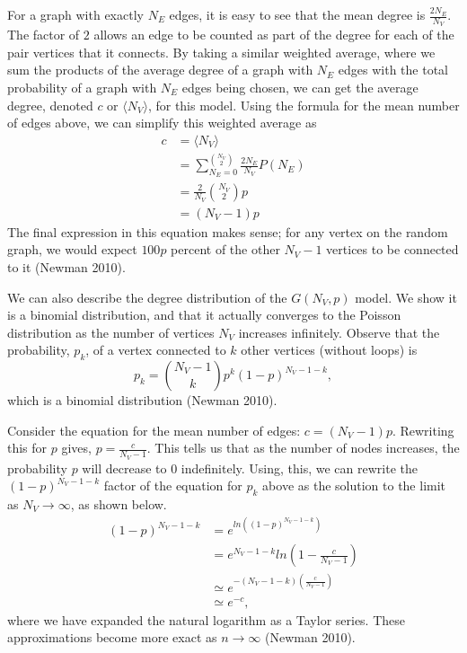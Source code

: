 \documentclass[12pt,twoside]{amherstthesis}
\begin{document}
  For a graph with exactly \(N_{E}\) edges, it is easy to see that the
  mean degree is \(\frac {2N_{E}} {N_{V}}\). The factor of \(2\) allows an
  edge to be counted as part of the degree for each of the pair vertices
  that it connects. By taking a similar weighted average, where we sum the
  products of the average degree of a graph with \(N_E\) edges with the
  total probability of a graph with \(N_E\) edges being chosen, we can get
  the average degree, denoted \(c\) or \(\langle N_{V} \rangle\), for this
  model. Using the formula for the mean number of edges above, we can
  simplify this weighted average as \[
  \begin{aligned}
  c &= \langle N_{V} \rangle \\
  &= \sum_{N_{E}=0}^{{N_{V} \choose 2}} \frac {2N_{E}} {N_{V}} P(N_{E}) \\
  &= \frac {2} {N_{V}} {N_{V} \choose 2}p \\
  &= (N_{V} - 1)p
  \end{aligned}
  \] The final expression in this equation makes sense; for any vertex on
  the random graph, we would expect \(100p\) percent of the other
  \(N_{V} - 1\) vertices to be connected to it (Newman 2010).
  
  We can also describe the degree distribution of the \(G(N_V, p)\) model.
  We show it is a binomial distribution, and that it actually converges to
  the Poisson distribution as the number of vertices \(N_{V}\) increases
  infinitely. Observe that the probability, \(p_k\), of a vertex connected
  to \(k\) other vertices (without loops) is
  \[p_{k} = {N_{V} -1 \choose k}p^{k}(1 - p)^{N_{V} - 1 - k},\] which is a
  binomial distribution (Newman 2010).
  
  Consider the equation for the mean number of edges:
  \(c = (N_{V} - 1)p\). Rewriting this for \(p\) gives,
  \(p = \frac {c} {N_{V} - 1}\). This tells us that as the number of nodes
  increases, the probability \(p\) will decrease to \(0\) indefinitely.
  Using, this, we can rewrite the \((1 - p)^{N_{V} - 1 - k}\) factor of
  the equation for \(p_{k}\) above as the solution to the limit as
  \(N_{V} \to \infty\), as shown below. \[
  \begin{aligned}
  (1 - p)^{N_{V} - 1 - k} &= e^{ln((1 - p)^{N_{V} - 1 - k})} \\
  &= e^{N_{V} - 1 - k}ln(1 - \frac {c} {N_{V} - 1}) \\
  &\simeq e^{-(N_{V} - 1 - k)(\frac {c} {N_{V} - 1})} \\
  &\simeq e^{-c},
  \end{aligned}
  \] where we have expanded the natural logarithm as a Taylor series.
  These approximations become more exact as \(n \to \infty\) (Newman
  2010).
  
\end{document}
